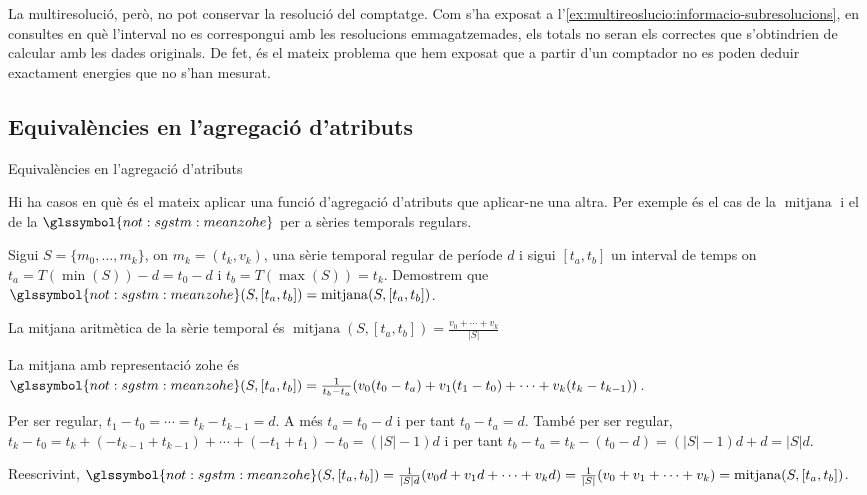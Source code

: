   La multiresolució, però, no pot conservar la resolució del
  comptatge.  Com s'ha exposat a
  l'\autoref{ex:multireoslucio:informacio-subresolucions}, en
  consultes en què l'interval no es correspongui amb les resolucions
  emmagatzemades, els totals no seran els correctes que s'obtindrien
  de calcular amb les dades originals.  De fet, és el mateix problema
  que hem exposat que a partir d'un comptador no es poden deduir
  exactament energies que no s'han mesurat.








\subsection{Equivalències en l'agregació d'atributs}




Equivalències en l'agregació d'atributs

  Hi ha casos en què és el mateix aplicar una funció d'agregació
  d'atributs que aplicar-ne una altra. Per exemple és el cas de la
  $\operatorname{mitjana}$ i el de la
  $\glssymbol{not:sgstm:meanzohe}$ per a sèries temporals regulars. 

  Sigui $S=\{m_0,\dotsc,m_k\}$, on $m_k=(t_k,v_k)$, una sèrie temporal
  regular de període $d$ i sigui $[t_a,t_b]$ un interval de temps on
  $t_a=T(\min(S))-d=t_0-d$ i $t_b=T(\max(S))=t_k$.  Demostrem que
  $\glssymbol{not:sgstm:meanzohe}(S,[t_a,t_b]) =
  \operatorname{mitjana}(S,[t_a,t_b])$.

  La mitjana aritmètica de la sèrie temporal és
  $\operatorname{mitjana}(S,[t_a,t_b])=\frac{v_0+\dotsb+v_k}{|S|}$
  
  La mitjana amb representació \gls{zohe} és
  $\glssymbol{not:sgstm:meanzohe}(S,[t_a,t_b])= \frac{1}{t_b-t_a} (
  v_0(t_0-t_a)+v_1(t_1-t_0)+\dotsb+ v_k(t_k-t_{k-1}) )$.

  Per ser regular, $t_1-t_0 = \dotsb = t_k-t_{k-1} = d$. A més
  $t_a=t_0-d$ i per tant $t_0-t_a = d$. També per ser regular,
  $t_k-t_0= t_k +(- t_{k-1} + t_{k-1}) + \dotsb + (- t_1 + t_1) - t_0
  = (|S|-1)d$ i per tant $t_b-t_a=t_k - (t_0 - d) = (|S|-1)d +d = |S|d$.

  Reescrivint, $\glssymbol{not:sgstm:meanzohe}(S,[t_a,t_b])=
  \frac{1}{|S|d} ( v_0d+v_1d+\dotsb+ v_kd ) = \frac{1}{|S|} (
  v_0+v_1+\dotsb+ v_k ) = \operatorname{mitjana}(S,[t_a,t_b])$.



